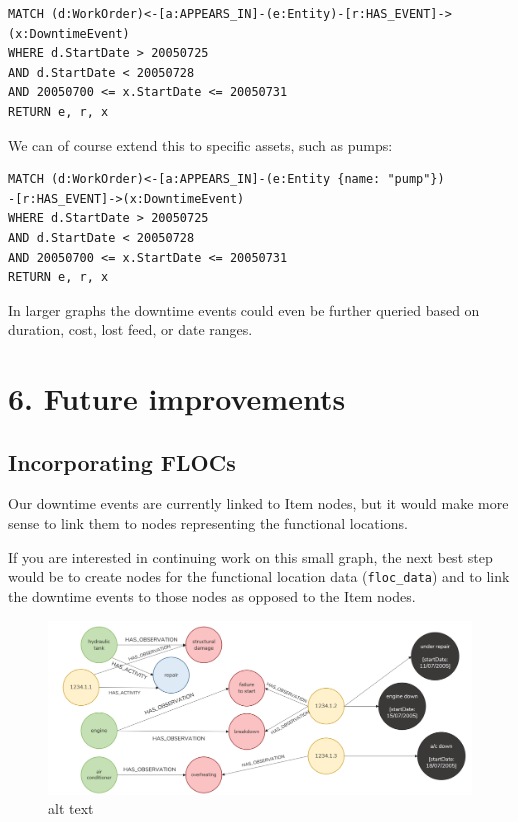\documentclass[11pt]{article}
\begin{document}
\begin{verbatim}
MATCH (d:WorkOrder)<-[a:APPEARS_IN]-(e:Entity)-[r:HAS_EVENT]->
(x:DowntimeEvent)
WHERE d.StartDate > 20050725
AND d.StartDate < 20050728
AND 20050700 <= x.StartDate <= 20050731
RETURN e, r, x
\end{verbatim}

We can of course extend this to specific assets, such as pumps:

\begin{verbatim}
MATCH (d:WorkOrder)<-[a:APPEARS_IN]-(e:Entity {name: "pump"})
-[r:HAS_EVENT]->(x:DowntimeEvent)
WHERE d.StartDate > 20050725
AND d.StartDate < 20050728
AND 20050700 <= x.StartDate <= 20050731
RETURN e, r, x
\end{verbatim}

In larger graphs the downtime events could even be further queried based
on duration, cost, lost feed, or date ranges.

    \hypertarget{future-improvements}{%
\section{6. Future improvements}\label{future-improvements}}

\hypertarget{incorporating-flocs}{%
\subsection{Incorporating FLOCs}\label{incorporating-flocs}}

Our downtime events are currently linked to Item nodes, but it would
make more sense to link them to nodes representing the functional
locations.

If you are interested in continuing work on this small graph, the next
best step would be to create nodes for the functional location data
(\texttt{floc\_data}) and to link the downtime events to those nodes as
opposed to the Item nodes.

\begin{figure}
\centering
\includegraphics{images/adding-flocs.png}
\caption{alt text}
\end{figure}
\end{document}
